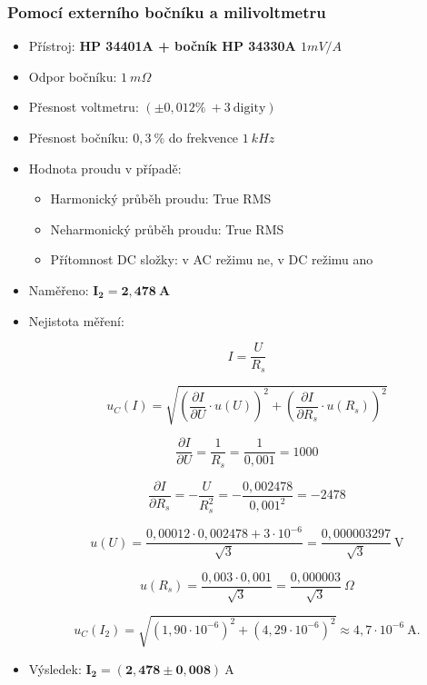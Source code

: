 \documentclass[a4paper,12pt]{article}
\begin{document}
\subsubsection{Pomocí externího bočníku a milivoltmetru}
\begin{itemize}
  \item Přístroj: \textbf{HP 34401A + bočník HP 34330A $1mV/A$}
  \item Odpor bočníku: $1\ m\Omega$
  \item Přesnost voltmetru: $(\pm 0,012 \%\ + 3\ \mathrm{digity})$
  \item Přesnost bočníku: $0,3\ \%$ do frekvence $1\ kHz$
  \item Hodnota proudu v případě:
    \begin{itemize}
      \item Harmonický průběh proudu: True RMS
      \item Neharmonický průběh proudu: True RMS
      \item Přítomnost DC složky: v AC režimu ne, v DC režimu ano
    \end{itemize}
  \item Naměřeno: $\mathbf{I_2 = 2{,}478\ A}$
  \item Nejistota měření:

  $$
    I = \frac{U}{R_s}
  $$

  $$
    u_C(I) = \sqrt{
      \left( \frac{\partial I}{\partial U} \cdot u(U) \right)^2 +
      \left( \frac{\partial I}{\partial R_s} \cdot u(R_s) \right)^2
    }
  $$

  $$
    \frac{\partial I}{\partial U} = \frac{1}{R_s} = \frac{1}{0{,}001} = 1000
  $$

  $$
    \frac{\partial I}{\partial R_s} = -\frac{U}{R_s^2}
    = -\frac{0{,}002478}{0{,}001^2}
    = -2478
  $$

  $$
    u(U) = \frac{0{,}00012 \cdot 0{,}002478 + 3 \cdot 10^{-6}}{\sqrt{3}}
    = \frac{0{,}000003297}{\sqrt{3}}\ \mathrm{V}
  $$

  $$
    u(R_s) = \frac{0{,}003 \cdot 0{,}001}{\sqrt{3}} = \frac{0{,}000003}{\sqrt{3}}\ \Omega
  $$

  $$
    u_C(I_2) = \sqrt{(1{,}90 \cdot 10^{-6})^2 +(4{,}29 \cdot 10^{-6})^2} \approx 4{,}7 \cdot 10^{-6}\ \mathrm{A}.
  $$

  \item Výsledek: $\mathbf{I_2 = (2{,}478 \pm 0{,}008)\ \mathrm{A}}$
\end{itemize}
\end{document}
